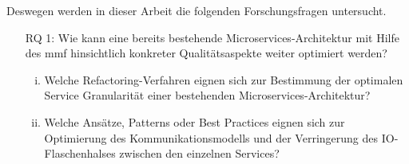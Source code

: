 Deswegen werden in dieser Arbeit die folgenden Forschungsfragen untersucht.

\begin{itemize}
	\item[RQ 1: ]Wie kann eine bereits bestehende Microservices-Architektur mit Hilfe des \acrfull{mmf} hinsichtlich konkreter Qualitätsaspekte weiter optimiert werden?
	\begin{enumerate}[i.]
		\item Welche Refactoring-Verfahren eignen sich zur Bestimmung der optimalen Service Granularität einer bestehenden Microservices-Architektur?
		\item Welche Ansätze, Patterns oder Best Practices eignen sich zur Optimierung des Kommunikationsmodells und der Verringerung des IO-Flaschenhalses zwischen den einzelnen Services?
	\end{enumerate}
\end{itemize}
